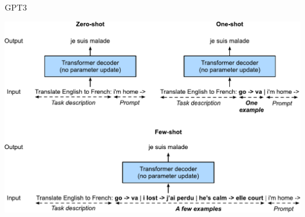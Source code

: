 \documentclass{beamer}
\begin{document}
\begin{frame}{GPT3}
\begin{center}
    \includegraphics[scale=0.5]{Module 6 (Attention-based networks)/pics/gpt-3-xshot.pdf}
\end{center}    
\end{frame}
\end{document}
